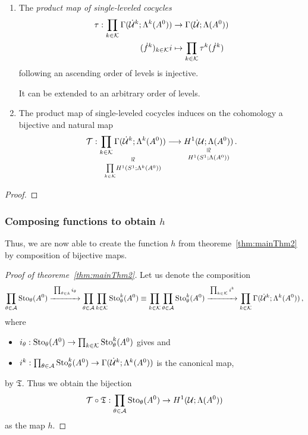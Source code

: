 \begin{cor}
  \begin{enumerate}
    \item The \emph{product map of single-leveled cocycles}
      \begin{align*}
        \tau:\prod_{k\in\mathcal{K}}\Gamma(\dot {\mathcal{U}}^k;\Lambda^k(A^0))
        &\to
        \Gamma(\dot{\mathcal{U}};\Lambda(A^0))
      \\(\dot f^k)_{k\in\mathcal{K}}i
        &\mapsto
        \prod_{k\in\mathcal{K}}\tau^k(\dot f^k)
      \end{align*}
      following an ascending order of levels is injective.
      \begin{rem}
        It can be extended to an arbitrary order of levels.
      \end{rem}
    \item The product map of single-leveled cocycles induces on the cohomology
      a bijective and natural map
      \[
        \cT:
        \underset{\underset{k\in\cK}\prod H^1(S^1;\Lambda^k(A^0))}{%
          \underset{\text{\rotatebox[origin=c]{-90}{$\cong$}}}{%
            \prod_{k\in\cK}\Gamma(\dot\cU^k;\Lambda^k(A^0))}}
        \longrightarrow
        \underset{H^1(S^1;\Lambda(A^0))}{%
          \underset{\text{\rotatebox[origin=c]{-90}{$\cong$}}}{%
            H^1(\cU;\Lambda(A^0))}}\,.
      \]
  \end{enumerate}
\end{cor}
\begin{proof}
  \TODO{}
\end{proof}
\subsubsection{Composing functions to obtain $h$}
Thus, we are now able to create the function $h$ from
theoreme~\ref{thm:mainThm2} by composition of bijective maps.
\begin{proof}[Proof of theoreme~\ref{thm:mainThm2}]
  Let us denote the composition
  \[
    \prod_{\theta\in\mathcal{A}}\operatorname{Sto}_\theta(A^0)
    \overset{\prod_{\theta\in\mathbb{A}}i_\theta}{\xrightarrow{\hspace*{1.2cm}}}
    \prod_{\theta\in\mathcal{A}}\prod_{k\in\mathcal{K}}\operatorname{Sto}_\theta^k(A^0)
    \equiv
    \prod_{k\in\mathcal{K}}\prod_{\theta\in\mathcal{A}}\operatorname{Sto}_\theta^k(A^0)
    \overset{\prod_{k\in\mathcal{K}}i^k}{\xrightarrow{\hspace*{1.2cm}}}
    \prod_{k\in\mathcal{K}}\Gamma(\dot{\mathcal{U}}^k;\Lambda^k(A^0))
    \,,
  \]
  where
  \begin{itemize}
    \item $i_\theta:\operatorname{Sto}_\theta(A^0)\to\prod_{k\in\mathcal{K}}\operatorname{Sto}_\theta^k(A^0)$ gives
      \TODO{} and
    \item $i^k:\prod_{\theta\in\mathcal{A}}\operatorname{Sto}_\theta^k(A^0)
      \to\Gamma(\dot{\mathcal{U}}^k;\Lambda^k(A^0))$ is the canonical map,
  \end{itemize}
  by $\mathfrak{T}$. Thus we obtain the bijection
  \[
    \mathcal{T}\circ\mathfrak{T}:
    \prod_{\theta\in\mathcal{A}}\operatorname{Sto}_\theta(A^0)
    \to
    H^1(\mathcal{U};\Lambda(A^0))
  \]
  as the map $h$.
\end{proof}
